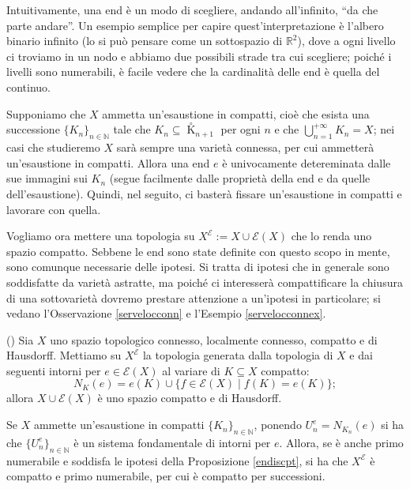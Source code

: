 Intuitivamente, una end è un modo di scegliere, andando all'infinito, ``da che parte andare''. Un esempio semplice per capire quest'interpretazione è l'albero binario infinito (lo si può pensare come un sottospazio di $\mathbb{R}^2$), dove a ogni livello ci troviamo in un nodo e abbiamo due possibili strade tra cui scegliere; poiché i livelli sono numerabili, è facile vedere che la cardinalità delle end è quella del continuo.

\begin{oss}
    Supponiamo che $X$ ammetta un'esaustione in compatti, cioè che esista una successione $\{K_n\}_{n\in\mathbb{N}}$ tale che $K_n\subseteq{\mathop K\limits^ \circ}_{n+1}$ per ogni $n$ e che $\displaystyle\bigcup_{n=1}^{+\infty} K_n=X$; nei casi che studieremo $X$ sarà sempre una varietà connessa, per cui ammetterà un'esaustione in compatti. Allora una end $e$ è univocamente detereminata dalle sue immagini sui $K_n$ (segue facilmente dalle proprietà della end e da quelle dell'esaustione). Quindi, nel seguito, ci basterà fissare un'esaustione in compatti e lavorare con quella.
\end{oss}

Vogliamo ora mettere una topologia su $X^\mathcal{E}:=X\cup\mathcal{E}(X)$ che lo renda uno spazio compatto. Sebbene le end sono state definite con questo scopo in mente, sono comunque necessarie delle ipotesi. Si tratta di ipotesi che in generale sono soddisfatte da varietà astratte, ma poiché ci interesserà compattificare la chiusura di una sottovarietà dovremo prestare attenzione a un'ipotesi in particolare; si vedano l'Osservazione \ref{servelocconn} e l'Esempio \ref{servelocconnex}.

\begin{prop} \label{endiscpt}
    (\cite[Chapter 1, Problem 19]{Sp}) Sia $X$ uno spazio topologico connesso, localmente connesso, compatto e di Hausdorff. Mettiamo su $X^\mathcal{E}$ la topologia generata dalla topologia di $X$ e dai seguenti intorni per $e\in\mathcal{E}(X)$ al variare di $K\subseteq X$ compatto:
    $$N_K(e)=e(K)\cup\{f\in\mathcal{E}(X)\mid f(K)=e(K)\};$$
    allora $X\cup\mathcal{E}(X)$ è uno spazio compatto e di Hausdorff.
\end{prop}

\begin{oss} \label{endiscptsucc}
    Se $X$ ammette un'esaustione in compatti $\{K_n\}_{n\in\mathbb{N}}$, ponendo $U_n^e=N_{K_n}(e)$ si ha che $\{U_n^e\}_{n\in\mathbb{N}}$ è un sistema fondamentale di intorni per $e$. Allora, se è anche primo numerabile e soddisfa le ipotesi della Proposizione \ref{endiscpt}, si ha che $X^\mathcal{E}$ è compatto e primo numerabile, per cui è compatto per successioni.
\end{oss}

